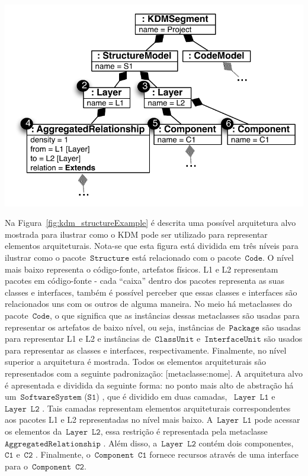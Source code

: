 \documentclass[12pt]{article}
\begin{document}
\begin{minipage}{.64\textwidth}
	\centering
	\includegraphics[scale=0.65]{StructureKDMINstance}
	\label{fig:kdm_instance_StructureExample}
\end{minipage}

Na Figura~\ref{fig:kdm_structureExample} é descrita uma possível arquitetura alvo mostrada para ilustrar como o KDM pode ser utilizado para representar elementos arquiteturais. Nota-se que esta figura está dividida em três níveis para ilustrar como o pacote~$\mathtt{Structure}$ está relacionado com o pacote~$\mathtt{Code}$. O nível mais baixo representa o código-fonte, artefatos físicos. L1 e L2 representam pacotes em código-fonte - cada ``caixa'' dentro dos pacotes representa as suas classes e interfaces, também é possível perceber que essas classes e interfaces são relacionados uns com os outros de alguma maneira. No meio há metaclasses do pacote~$\mathtt{Code}$, o que significa que as instâncias dessas metaclasses são usadas para representar os artefatos de baixo nível, ou seja, instâncias de~$\mathtt{Package}$ são usadas para representar L1 e L2 e instâncias de~$\mathtt{ClassUnit}$ e~$\mathtt{InterfaceUnit}$ são usados para representar as classes e interfaces, respectivamente. Finalmente, no nível superior a arquitetura é mostrada. Todos os elementos arquiteturais são representados com a seguinte padronização: [metaclasse:nome]. A arquitetura alvo é apresentada e dividida da seguinte forma: no ponto mais alto de abstração há um~$\mathtt{SoftwareSystem}$ ($\mathtt{S1}$) , que é dividido em duas camadas, ~$\mathtt{Layer}$~$\mathtt{L1}$  e ~$\mathtt{Layer}$~$\mathtt{L2}$ . Tais camadas representam elementos arquiteturais correspondentes aos pacotes L1 e L2 representadas no nível mais baixo. A~$\mathtt{Layer}$~$\mathtt{L1}$ pode acessar os elementos da~$\mathtt{Layer}$~$\mathtt{L2}$, essa restrição  é representada pela metaclasse~$\mathtt{AggregatedRelationship}$ . Além disso, a~$\mathtt{Layer}$~$\mathtt{L2}$ contém dois componentes,~$\mathtt{C1}$  e~$\mathtt{C2}$ . Finalmente, o~$\mathtt{Component}$~$\mathtt{C1}$ fornece recursos através de uma interface para o~$\mathtt{Component}$~$\mathtt{C2}$.
\end{document}
